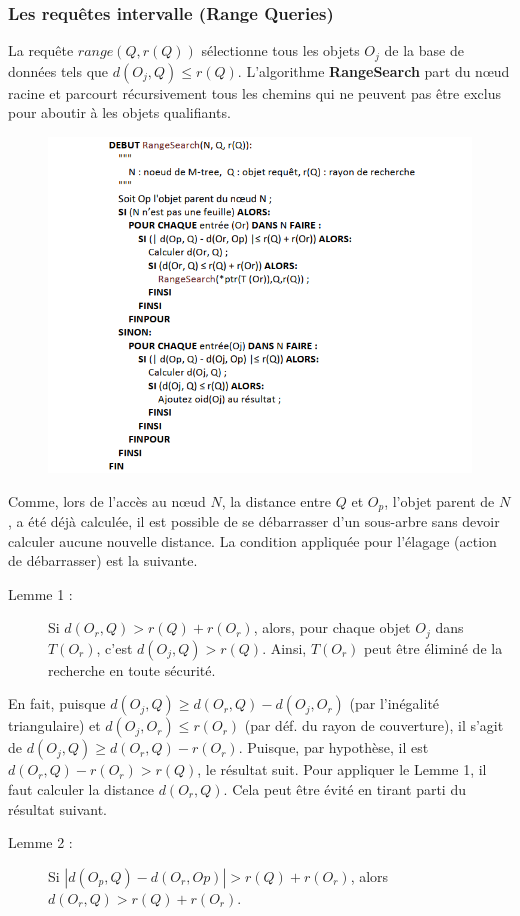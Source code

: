 \subsubsection{Les requêtes intervalle (Range Queries)}
La requête $ range(Q, r(Q)) $ sélectionne tous les objets $ O_j $ de la base de données tels que $ d(O_j, Q) \le r(Q) $. L'algorithme \textbf{RangeSearch} part du nœud racine et parcourt récursivement tous les chemins qui ne peuvent pas être exclus pour aboutir à les objets qualifiants.
\begin{figure}[H]
	\centering
	\includegraphics[width=.9 \textwidth]{Figures/rangesearxh.png} %
\end{figure} 

Comme, lors de l'accès au nœud $ N $, la distance entre $ Q $ et $ O_p $, l'objet parent de $ N $, a été déjà calculée, il est possible de se débarrasser d'un sous-arbre sans devoir calculer aucune nouvelle distance. La condition appliquée pour l'élagage (action de débarrasser) est la suivante.
\begin{description}
	\item[Lemme 1 :] Si $ d(O_r, Q) > r(Q) + r(O_r) $, alors, pour chaque objet $ O_j  $ dans $ T (O_r) $, c'est $ d(O_j, Q) > r(Q) $. Ainsi, $ T (O_r) $ peut être éliminé de la recherche en toute sécurité.
\end{description}
En fait, puisque $ d(O_j, Q) \ge d(O_r, Q) - d(O_j, O_r) $ (par l'inégalité triangulaire) et $ d(O_j, O_r) \le r(O_r) $ (par déf. du rayon de couverture), il s'agit de $ d(O_j, Q) \ge d(O_r, Q)-r(O_r) $.
Puisque, par hypothèse, il est $ d(O_r, Q) - r(O_r) > r(Q) $, le résultat suit.
Pour appliquer le Lemme 1, il faut calculer la distance $ d(O_r, Q) $. Cela peut être évité en tirant parti du résultat suivant.
\begin{description}
	\item[Lemme 2 :]  Si $ | d(O_p, Q) - d(O_r, Op) |> r(Q) + r(O_r) $, alors $ d(O_r, Q) > r(Q) + r(O_r) $.
\end{description}

